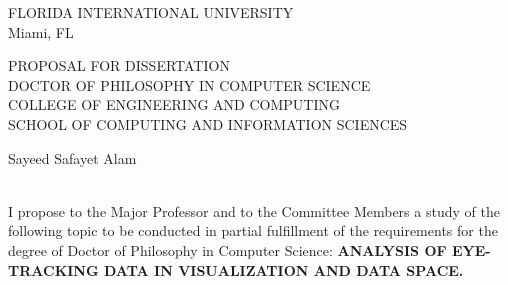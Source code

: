 \thispagestyle{empty}

\begin{titlepage}
\centering

FLORIDA INTERNATIONAL UNIVERSITY
\\
Miami, FL
\vfill


PROPOSAL FOR DISSERTATION
\\[0.4in]
DOCTOR OF PHILOSOPHY IN COMPUTER SCIENCE
\\[0.4in]
COLLEGE OF ENGINEERING AND COMPUTING
\\[0.4in]
SCHOOL OF COMPUTING AND INFORMATION SCIENCES
\\[0.4in]
\vfill



Sayeed Safayet Alam
\\[1in]
\the\year
\\\vfill
\par
I propose to the Major Professor and to the Committee Members a study of the following topic to be conducted in partial fulfillment of the requirements for the degree of Doctor of Philosophy in Computer Science: \textbf{ANALYSIS OF EYE-TRACKING DATA IN VISUALIZATION AND DATA SPACE.}

\end{titlepage}